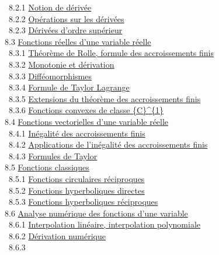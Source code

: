 \documentclass[]{article}
\begin{document}
~~8.2.1 \href{coursse45.html\#x56-2410008.2.1}{Notion de dérivée} \\
~~8.2.2 \href{coursse45.html\#x56-2420008.2.2}{Opérations sur les
dérivées} \\ ~~8.2.3 \href{coursse45.html\#x56-2430008.2.3}{Dérivées
d'ordre supérieur} \\ ~8.3
\href{coursse46.html\#x57-2440008.3}{Fonctions réelles d'une variable
réelle} \\ ~~8.3.1 \href{coursse46.html\#x57-2450008.3.1}{Théorème de
Rolle, formule des accroissements finis} \\ ~~8.3.2
\href{coursse46.html\#x57-2460008.3.2}{Monotonie et dérivation} \\
~~8.3.3 \href{coursse46.html\#x57-2470008.3.3}{Difféomorphismes} \\
~~8.3.4 \href{coursse46.html\#x57-2480008.3.4}{Formule de Taylor
Lagrange} \\ ~~8.3.5 \href{coursse46.html\#x57-2490008.3.5}{Extensions
du théorème des accroissements finis} \\ ~~8.3.6
\href{coursse46.html\#x57-2500008.3.6}{Fonctions convexes de classe
\{C\}\^{}\{1\}} \\ ~8.4 \href{coursse47.html\#x58-2510008.4}{Fonctions
vectorielles d'une variable réelle} \\ ~~8.4.1
\href{coursse47.html\#x58-2520008.4.1}{Inégalité des accroissements
finis} \\ ~~8.4.2 \href{coursse47.html\#x58-2530008.4.2}{Applications de
l'inégalité des accroissements finis} \\ ~~8.4.3
\href{coursse47.html\#x58-2540008.4.3}{Formules de Taylor} \\ ~8.5
\href{coursse48.html\#x59-2550008.5}{Fonctions classiques} \\ ~~8.5.1
\href{coursse48.html\#x59-2560008.5.1}{Fonctions circulaires
réciproques} \\ ~~8.5.2 \href{coursse48.html\#x59-2570008.5.2}{Fonctions
hyperboliques directes} \\ ~~8.5.3
\href{coursse48.html\#x59-2580008.5.3}{Fonctions hyperboliques
réciproques} \\ ~8.6 \href{coursse49.html\#x60-2590008.6}{Analyse
numérique des fonctions d'une variable} \\ ~~8.6.1
\href{coursse49.html\#x60-2600008.6.1}{Interpolation linéaire,
interpolation polynomiale} \\ ~~8.6.2
\href{coursse49.html\#x60-2610008.6.2}{Dérivation numérique} \\ ~~8.6.3
\end{document}

